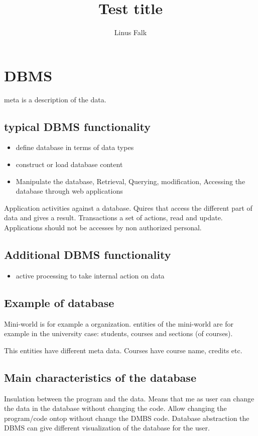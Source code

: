 \documentclass[a4paper]{article}
\title{Test title}
\author{Linus Falk}
\begin{document}
\maketitle
\section*{DBMS}

meta is a description of the data. 

\subsection*{typical DBMS functionality}
\begin{itemize}
	\item define database in terms of data types
	\item construct or load database content
	\item Manipulate the database, Retrieval, Querying, modification, Accessing the database through web applications
\end{itemize}


Application activities against a database. Quires that access the different part of data and gives a result. Transactions a set of actions, read and update. Applications should not be accesses by non authorized personal. 

\subsection*{Additional DBMS functionality}
\begin{itemize}
	\item active processing to take internal action on data
\end{itemize}


\subsection*{Example of database}
Mini-world is for example a organization. entities of the mini-world are for example in the university case: students, courses and sections (of courses).  

This entities have different meta data. Courses have course name, credits etc. 

\subsection*{Main characteristics of the database}
Insulation between the program and the data. Means that me as user can change the data in the database without changing the code. Allow changing the program/code ontop without change the DMBS code. 
Database abstraction the DBMS can give different visualization of the database for the user.
\end{document}
